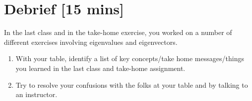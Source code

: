 



\section{Debrief [15 mins]}
In the last class and in the take-home exercise, you worked on a number of different exercises involving eigenvalues and eigenvectors. 

\begin{prob}
\begin{enumerate}
\item With your table, identify a list of key concepts/take home messages/things you learned in the last class and take-home assignment.
\item Try to resolve your confusions with the folks at your table and by talking to an instructor.
\end{enumerate}
\end{prob}

